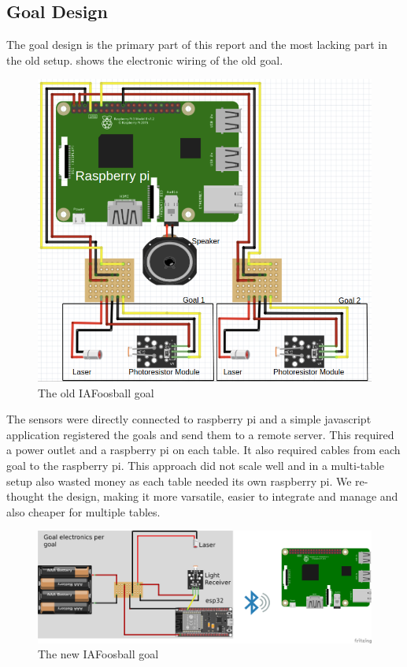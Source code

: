 \subsection{Goal Design}
The goal design is the primary part of this report and the most lacking part in the old setup. 
 shows the electronic wiring of the old goal.

\begin{figure}[h!]
    \centering
    \includegraphics[scale=0.3]{figures/goal-old.png}
    \caption{The old IAFoosball goal}\label{fig:goalOld}
\end{figure}

The sensors were directly connected to raspberry pi and a simple javascript application registered the goals and send them to a remote server. This required a power outlet and a raspberry pi on each table. It also required cables from each goal to the raspberry pi. This approach did not scale well and in a multi-table setup also wasted money as each table needed its own raspberry pi. We re-thought the design, making it more varsatile, easier to integrate and manage and also cheaper for multiple tables.

\begin{figure}[h!]
    \centering
    \includegraphics[scale=0.4]{figures/goal-new.png}%
    \caption{The new IAFoosball goal}\label{fig:goalNew}
\end{figure}

